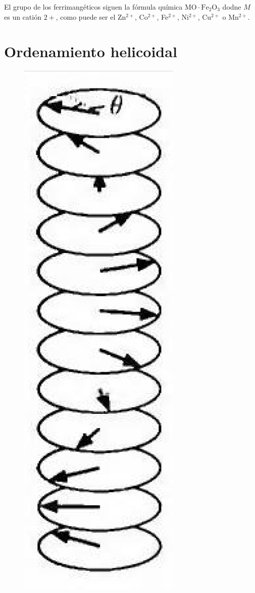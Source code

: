 \documentclass[12pt,a4paper]{book}
\numberwithin{equation}{section}
\numberwithin{figure}{section}
\begin{document}
El grupo de los ferrimangéticos siguen la fórmula química $\mathrm{MO} \cdot \mathrm{Fe}_2 \mathrm{O}_3$ dodne $M$ es un catión $2+$, como puede ser el Zn$^{2+}$, Co$^{2+}$, Fe$^{2+}$, Ni$^{2+}$, Cu$^{2+}$ o Mn$^{2+}$. \\

\section{Ordenamiento helicoidal}

\begin{figure}
    \vspace{-50pt}
    \centering
    \includegraphics[scale=0.3]{05-Helical.png}
\end{figure}
\end{document}
